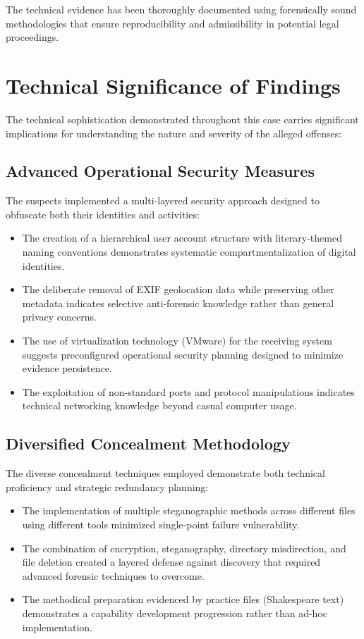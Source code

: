 The technical evidence has been thoroughly documented using forensically sound methodologies that ensure reproducibility and admissibility in potential legal proceedings.

\section{Technical Significance of Findings}
The technical sophistication demonstrated throughout this case carries significant implications for understanding the nature and severity of the alleged offenses:

\subsection{Advanced Operational Security Measures}
The suspects implemented a multi-layered security approach designed to obfuscate both their identities and activities:

\begin{itemize}
    \item The creation of a hierarchical user account structure with literary-themed naming conventions demonstrates systematic compartmentalization of digital identities.
    
    \item The deliberate removal of EXIF geolocation data while preserving other metadata indicates selective anti-forensic knowledge rather than general privacy concerns.
    
    \item The use of virtualization technology (VMware) for the receiving system suggests preconfigured operational security planning designed to minimize evidence persistence.
    
    \item The exploitation of non-standard ports and protocol manipulations indicates technical networking knowledge beyond casual computer usage.
\end{itemize}

\subsection{Diversified Concealment Methodology}
The diverse concealment techniques employed demonstrate both technical proficiency and strategic redundancy planning:

\begin{itemize}
    \item The implementation of multiple steganographic methods across different files using different tools minimized single-point failure vulnerability.
    
    \item The combination of encryption, steganography, directory misdirection, and file deletion created a layered defense against discovery that required advanced forensic techniques to overcome.
    
    \item The methodical preparation evidenced by practice files (Shakespeare text) demonstrates a capability development progression rather than ad-hoc implementation.
\end{itemize}

